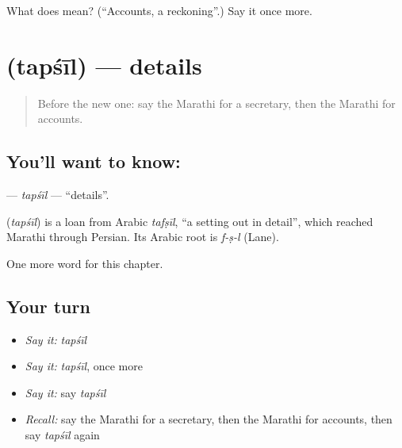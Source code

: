 \begin{tcolorbox}[breakable,colback=teal!4,colframe=teal!35!black,title={Before you move on}]
What does  mean? (\textquotedblleft{}Accounts, a reckoning\textquotedblright{}.) Say it once more.
\end{tcolorbox}
\section[\texorpdfstring{\mr{तपशील} (tapśīl)}{तपशील (tapśīl)}]{ (tapśīl) — details}

\label{lesson:MR-C191-tapsil}



\begin{quote}
Before the new one: say the Marathi for a secretary, then the Marathi for accounts.
\end{quote}

\subsection*{You'll want to know: }
\textbf{} — \emph{tapśīl} — \textquotedblleft{}details\textquotedblright{}.

\begin{cousinweb}
\textbf{} (\emph{tapśīl}) is a loan from Arabic \emph{tafṣīl}, \textquotedblleft{}a setting out in detail\textquotedblright{}, which reached Marathi through Persian. Its Arabic root is \emph{f-ṣ-l} (Lane).
\end{cousinweb}

\begin{grammarlens}[title={What you've built}]
One more word for this chapter.
\end{grammarlens}

\subsection*{Your turn}
\begin{itemize}
\raggedright
  \item \emph{Say it:} \emph{tapśīl}
  \item \emph{Say it:} \emph{tapśīl}, once more
  \item \emph{Say it:} say \emph{tapśīl}
  \item \emph{Recall:} say the Marathi for a secretary, then the Marathi for accounts, then say \emph{tapśīl} again
\end{itemize}

